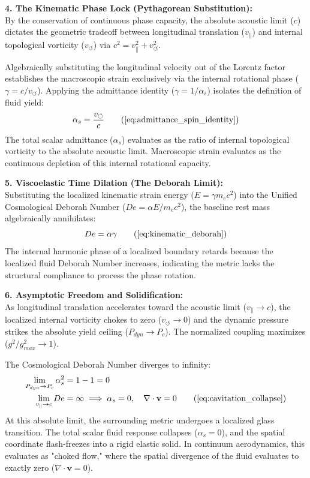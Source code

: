 \documentclass[11pt, a4paper]{article}
\begin{document}
\textbf{4. The Kinematic Phase Lock (Pythagorean Substitution):} \\
By the conservation of continuous phase capacity, the absolute acoustic limit ($c$) dictates the geometric tradeoff between longitudinal translation ($v_{\parallel}$) and internal topological vorticity ($v_{\circlearrowleft}$) via $c^2 = v_{\parallel}^2 + v_{\circlearrowleft}^2$.

Algebraically substituting the longitudinal velocity out of the Lorentz factor establishes the macroscopic strain exclusively via the internal rotational phase ($\gamma = c/v_{\circlearrowleft}$). Applying the admittance identity ($\gamma = 1/\alpha_s$) isolates the definition of fluid yield:
\begin{equation}
    \alpha_s = \frac{v_{\circlearrowleft}}{c} \tag{\ref{eq:admittance_spin_identity}}
\end{equation}
The total scalar admittance ($\alpha_s$) evaluates as the ratio of internal topological vorticity to the absolute acoustic limit. Macroscopic strain evaluates as the continuous depletion of this internal rotational capacity.

\textbf{5. Viscoelastic Time Dilation (The Deborah Limit):} \\
Substituting the localized kinematic strain energy ($E = \gamma m_e c^2$) into the Unified Cosmological Deborah Number ($De = \alpha E / m_e c^2$), the baseline rest mass algebraically annihilates:
\begin{equation}
    De = \alpha \gamma \tag{\ref{eq:kinematic_deborah}}
\end{equation}
The internal harmonic phase of a localized boundary retards because the localized fluid Deborah Number increases, indicating the metric lacks the structural compliance to process the phase rotation.

\textbf{6. Asymptotic Freedom and Solidification:} \\
As longitudinal translation accelerates toward the acoustic limit ($v_{\parallel} \to c$), the localized internal vorticity chokes to zero ($v_{\circlearrowleft} \to 0$) and the dynamic pressure strikes the absolute yield ceiling ($P_{dyn} \to P_c$). The normalized coupling maximizes ($g^2/g_{max}^2 \to 1$).

The Cosmological Deborah Number diverges to infinity:
\begin{align}
    \lim_{P_{dyn} \to P_c} \alpha_s^2 &= 1 - 1 = 0 \\
    \lim_{v_{\parallel} \to c} De &= \infty \implies \alpha_s = 0, \quad \nabla \cdot \mathbf{v} = 0 \tag{\ref{eq:cavitation_collapse}}
\end{align}
At this absolute limit, the surrounding metric undergoes a localized glass transition. The total scalar fluid response collapses ($\alpha_s = 0$), and the spatial coordinate flash-freezes into a rigid elastic solid. In continuum aerodynamics, this evaluates as "choked flow," where the spatial divergence of the fluid evaluates to exactly zero ($\nabla \cdot \mathbf{v} = 0$). 
\end{document}
